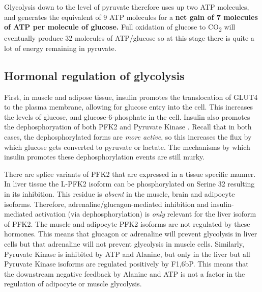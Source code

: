 \documentclass{tufte-handout}
\begin{document}
Glycolysis down to the level of pyruvate therefore uses up two ATP molecules, and generates the equivalent of 9 ATP molecules for a \textbf{net gain of 7 molecules of ATP per molecule of glucose.}  Full oxidation of glucose to CO\textsubscript{2} will eventually produce 32 molecules of ATP/glucose so at this stage there is quite a lot of energy remaining in pyruvate.

\subsection{Hormonal regulation of glycolysis}

  First, in muscle and adipose tissue, insulin promotes the translocation of GLUT4 to the plasma membrane, allowing for glucose entry into the cell.  This increases the levels of glucose, and glucose-6-phosphate in the cell.  Insulin also promotes the dephosphoryation of both PFK2 and Pyruvate Kinase \citep{PROBST1985}. Recall that in both cases, the dephosphorylated forms are \emph{more active}, so this increases the flux by which glucose gets converted to pyruvate or lactate.  The mechanisms by which insulin promotes these dephosphorylation events are still murky.

  There are splice variants of PFK2 that are expressed in a tissue specific manner.  In liver tissue the L-PFK2 isoform can be phosphorylated on Serine 32 resulting in its inhibition.  This residue is \emph{absent} in the muscle, brain and adipocyte isoforms.  Therefore, adrenaline/glucagon-mediated inhibition and insulin-mediated activation (via dephosphorylation) is \emph{only} relevant for the liver isoform of PFK2.  The muscle and adipocyte PFK2 isoforms are not regulated by these hormones.  This means that glucagon or adrenaline will prevent glycolysis in liver cells but that adrenaline will not prevent glycolysis in muscle cells.  Similarly, Pyruvate Kinase is inhibited by ATP and Alanine, but only in the liver but all Pyruvate Kinase isoforms are regulated positively by F1,6bP.  This means that the downstream negative feedback by Alanine and ATP is not a factor in the regulation of adipocyte or muscle glycolysis.  
\end{document}
